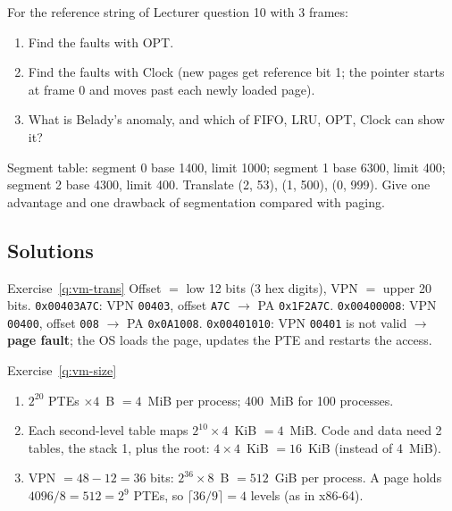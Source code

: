 \begin{exercise}\label{q:vm-repl}
For the reference string of Lecturer question 10 with 3 frames:
\begin{enumerate}[label=(\alph*),leftmargin=*]
  \item Find the faults with OPT.
  \item Find the faults with Clock (new pages get reference bit 1; the pointer
  starts at frame 0 and moves past each newly loaded page).
  \item What is Belady's anomaly, and which of FIFO, LRU, OPT, Clock can show it?
\end{enumerate}
\end{exercise}

\begin{exercise}[Segmentation]\label{q:vm-seg}
Segment table: segment 0 base 1400, limit 1000; segment 1 base 6300, limit 400;
segment 2 base 4300, limit 400. Translate (2, 53), (1, 500), (0, 999).
Give one advantage and one drawback of segmentation compared with paging.
\end{exercise}

\subsection{Solutions}
\label{sec:vm-sol}

\begin{noot}{Exercise~\ref{q:vm-trans}}
Offset $=$ low 12 bits (3 hex digits), VPN $=$ upper 20 bits.
\texttt{0x00403A7C}: VPN \texttt{00403}, offset \texttt{A7C} $\to$ PA
\texttt{0x1F2A7C}.
\texttt{0x00400008}: VPN \texttt{00400}, offset \texttt{008} $\to$ PA
\texttt{0x0A1008}.
\texttt{0x00401010}: VPN \texttt{00401} is not valid $\to$ \textbf{page fault}; the
OS loads the page, updates the PTE and restarts the access.
\end{noot}

\begin{noot}{Exercise~\ref{q:vm-size}}
\begin{enumerate}[label=(\alph*),leftmargin=*]
  \item $2^{20}$ PTEs $\times4$~B $=4$~MiB per process; 400~MiB for 100 processes.
  \item Each second-level table maps $2^{10}\times4$~KiB $=4$~MiB. Code and data need
  2 tables, the stack 1, plus the root: $4\times4$~KiB $=16$~KiB (instead of 4~MiB).
  \item VPN $=48-12=36$ bits: $2^{36}\times8$~B $=512$~GiB per process. A page holds
  $4096/8=512=2^9$ PTEs, so $\lceil36/9\rceil=4$ levels (as in x86-64).
\end{enumerate}
\end{noot}


